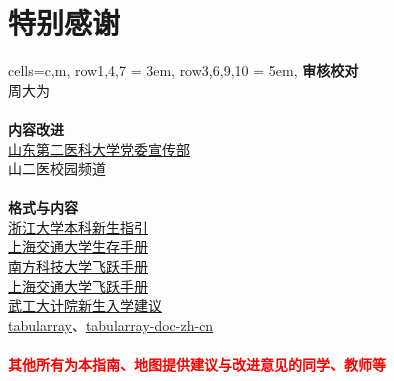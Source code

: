\chapter*{特别感谢}
\begin{tblr}[
    long,
    theme=no-caption
    ]{
    cells={c,m},
    row{1,4,7} = {3em},
    row{3,6,9,10} = {5em},}
    {\large\textbf{审核校对}}                                                             \\
    {周大为}                                                                              \\
    \\
    {\large\textbf{内容改进}}                                                             \\
    {
    \uline{\href{https://xchb.sdsmu.edu.cn/}{山东第二医科大学党委宣传部}}                 \\
    山二医校园频道
    }                                                                                     \\
    \\
    {\large\textbf{格式与内容}}                                                           \\
    {
    \uline{\href{https://zjuers.com/welcome/}{浙江大学本科新生指引}}                      \\
    \uline{\href{https://survivesjtu.gitbook.io/survivesjtumanual}{上海交通大学生存手册}} \\
    \uline{\href{https://sustech-application.com/}{南方科技大学飞跃手册}}                 \\
    \uline{\href{https://survivesjtu.github.io/SJTU-Application/}{上海交通大学飞跃手册}}  \\
    \uline{\href{https://gitee.com/hanyaner/witjij}{武工大计院新生入学建议}}              \\
    \uline{\href{https://github.com/lvjr/tabularray}{tabularray}}、\uline{\href{https://gitee.com/nwafu_nan/tabularray-doc-zh-cn}{tabularray-doc-zh-cn}}
    }                                                                                     \\
    \\
    {\large\textbf{\textcolor{red}{其他所有为本指南、地图提供建议与改进意见的同学、教师等}}}
\end{tblr}
